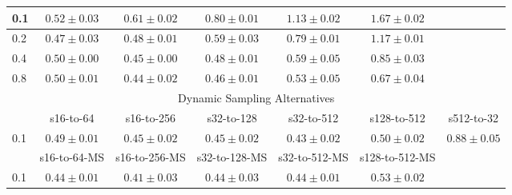 \documentclass[10pt,journal,compsoc]{IEEEtran}
\begin{document}
\begin{table*}[!htbp]
\begin{center}
{\begin{tabular}{|l|c|c|c|c|c|c|}
\hline
0.1   & $0.52\pm0.03$ & $0.61\pm0.02$ & $0.80\pm0.01$ & $1.13\pm0.02$ & $1.67\pm0.02$ &  \\
\hline
0.2   & $0.47\pm0.03$ & $0.48\pm0.01$ & $0.59\pm0.03$ & $0.79\pm0.01$ & $1.17\pm0.01$ &  \\
\hline
0.4   & $0.50\pm0.00$ & $0.45\pm0.00$ & $0.48\pm0.01$ & $0.59\pm0.05$ & $0.85\pm0.03$ &  \\
\hline
0.8   & $0.50\pm0.01$ & $0.44\pm0.02$ & $0.46\pm0.01$ & $0.53\pm0.05$ & $0.67\pm0.04$ &  \\
\hline
\multicolumn{7}{|c|}{Dynamic Sampling Alternatives}\\
\hline
& s16-to-64 & s16-to-256  & s32-to-128 & s32-to-512 & s128-to-512 & s512-to-32 \\
\hline
0.1  & $0.49\pm0.01$ & $0.45\pm0.02$ & $0.45\pm0.02$ &  $0.43\pm0.02$ & $0.50\pm0.02$ & $0.88\pm0.05$ \\
\hline
& s16-to-64-MS & s16-to-256-MS & s32-to-128-MS & s32-to-512-MS & s128-to-512-MS & \\
\hline
0.1  & $0.44\pm0.01$ & $0.41\pm0.03$ & $0.44\pm0.03$ & $0.44\pm0.01$ & $0.53\pm0.02$ & \\
\hline


\end{tabular}}
\end{center}
\end{table*}
\end{document}
